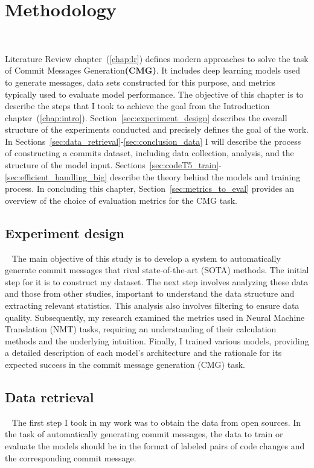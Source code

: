 \chapter{Methodology}~\label{chap:met}

Literature Review chapter~(\ref{chap:lr}) defines modern approaches to solve the task of Commit Messages Generation\textbf{(CMG)}. It includes deep learning models used to generate messages, data sets constructed for this purpose, and metrics typically used to evaluate model performance. The objective of this chapter is to describe the steps that I took to achieve the goal from the Introduction chapter~(\ref{chap:intro}). Section~\ref{sec:experiment_design} describes the overall structure of the experiments conducted and precisely defines the goal of the work. In Sections~\ref{sec:data_retrieval}-\ref{sec:conclusion_data} I will describe the process of constructing a commits dataset, including data collection, analysis, and the structure of the model input. Sections~\ref{sec:codeT5_train}-\ref{sec:efficient_handling_big} describe the theory behind the models and training process. In concluding this chapter, Section~\ref{sec:metrics_to_eval} provides an overview of the choice of evaluation metrics for the CMG task.

\section{Experiment design}~\label{sec:experiment_design}
The main objective of this study is to develop a system to automatically generate commit messages that rival state-of-the-art (SOTA) methods. The initial step for it is to construct my dataset. The next step involves analyzing these data and those from other studies, important to understand the data structure and extracting relevant statistics. This analysis also involves filtering to ensure data quality. Subsequently, my research examined the metrics used in Neural Machine Translation (NMT) tasks, requiring an understanding of their calculation methods and the underlying intuition. Finally, I trained various models, providing a detailed description of each model's architecture and the rationale for its expected success in the commit message generation (CMG) task.

\section{Data retrieval}~\label{sec:data_retrieval}
The first step I took in my work was to obtain the data from open sources. In the task of automatically generating commit messages, the data to train or evaluate the models should be in the format of labeled pairs of code changes and the corresponding commit message.

